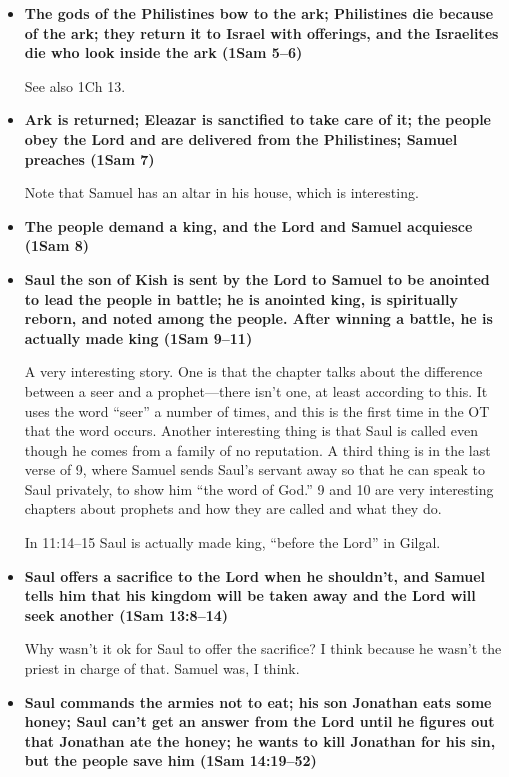 \begin{itemize}
\item \textbf{The gods of the Philistines bow to the ark; Philistines die because of the ark; they return it to Israel with offerings, and the Israelites die who look inside the ark (1Sam 5--6)}

See also 1Ch 13.

\item \textbf{Ark is returned; Eleazar is sanctified to take care of it; the people obey the Lord and are delivered from the Philistines; Samuel preaches (1Sam 7)}

	Note that Samuel has an altar in his house, which is interesting.

\item \textbf{The people demand a king, and the Lord and Samuel acquiesce (1Sam 8)}

\item \textbf{Saul the son of Kish is sent by the Lord to Samuel to be anointed to lead the people in battle; he is anointed king, is spiritually reborn, and noted among the people. After winning a battle, he is actually made king (1Sam 9--11)}

	A very interesting story. One is that the chapter talks about the difference between a seer and a prophet---there isn't one, at least according to this. It uses the word ``seer'' a number of times, and this is the first time in the OT that the word occurs. Another interesting thing is that Saul is called even though he comes from a family of no reputation. A third thing is in the last verse of 9, where Samuel sends Saul's servant away so that he can speak to Saul privately, to show him ``the word of God.'' 9 and 10 are very interesting chapters about prophets and how they are called and what they do.
	
	In 11:14--15 Saul is actually made king, ``before the Lord'' in Gilgal.
	
\item \textbf{Saul offers a sacrifice to the Lord when he shouldn't, and Samuel tells him that his kingdom will be taken away and the Lord will seek another (1Sam 13:8--14)}

	Why wasn't it ok for Saul to offer the sacrifice? I think because he wasn't the priest in charge of that. Samuel was, I think.
	
\item \textbf{Saul commands the armies not to eat; his son Jonathan eats some honey; Saul can't get an answer from the Lord until he figures out that Jonathan ate the honey; he wants to kill Jonathan for his sin, but the people save him (1Sam 14:19--52)}


\end{itemize}
